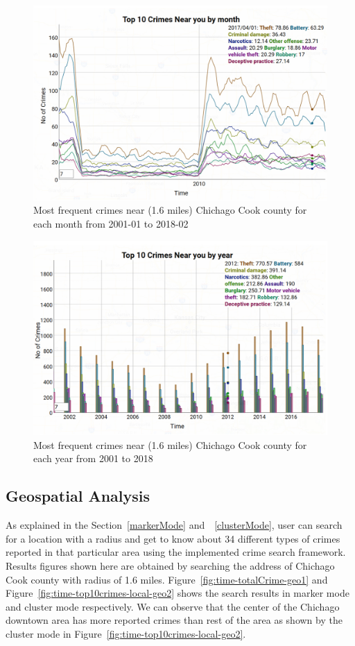 \begin{figure}[htb]
	\centering\includegraphics[width=\columnwidth]{images/time2.jpg}
	\caption{Most frequent crimes near (1.6 miles) Chichago Cook
        county for each month from 2001-01 to
        2018-02 }\label{fig:time-top10crimes-local}
\end{figure}

\begin{figure}[htb]
	\centering\includegraphics[width=\columnwidth]{images/time3.jpg}
	\caption{Most frequent crimes near (1.6 miles) Chichago
        Cook county for each year from 2001 to
        2018}\label{fig:year-top10crimes-local}
\end{figure}

\subsection{Geospatial Analysis}
As explained in the Section~\ref{markerMode} and~~\ref{clusterMode},
user can search for a location with a radius and get to know about 34
different types of crimes reported in that particular area using the
implemented crime search framework. Results figures shown here are
obtained by searching the address of Chichago Cook county with radius
of 1.6 miles. Figure~\ref{fig:time-totalCrime-geo1} and
Figure~\ref{fig:time-top10crimes-local-geo2} shows the search results
in marker mode and cluster mode respectively. We can observe that the
center of the Chichago downtown area has more reported crimes than
rest of the area as shown by the cluster mode in
Figure~\ref{fig:time-top10crimes-local-geo2}.

